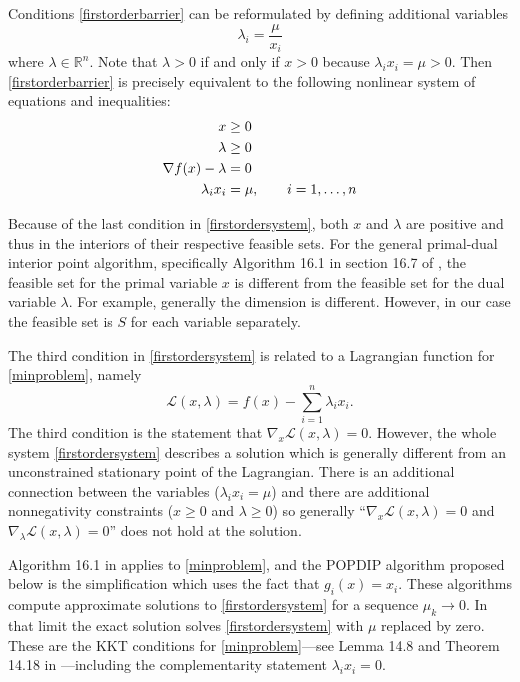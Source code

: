 \documentclass[11pt]{article}
\newcommand{\RR}{\mathbb{R}}
\newcommand{\grad}{\nabla}
\begin{document}
Conditions \eqref{firstorderbarrier} can be reformulated by defining additional variables
    $$\lambda_i = \frac{\mu}{x_i}$$
where $\lambda\in\RR^n$.  Note that $\lambda>0$ if and only if $x>0$ because $\lambda_i x_i = \mu > 0$.  Then \eqref{firstorderbarrier} is precisely equivalent to the following nonlinear system of equations and inequalities:
\begin{align}
x &\ge 0 \label{firstordersystem} \\
\lambda &\ge 0 \notag \\
\grad f(x) - \lambda &= 0 \notag \\
\lambda_i x_i &= \mu, \qquad i=1,\dots,n \notag
\end{align}

Because of the last condition in \eqref{firstordersystem}, both $x$ and $\lambda$ are positive and thus in the interiors of their respective feasible sets.  For the general primal-dual interior point algorithm, specifically Algorithm 16.1 in section 16.7 of \cite{GrivaNashSofer2009}, the feasible set for the primal variable $x$ is different from the feasible set for the dual variable $\lambda$.  For example, generally the dimension is different.  However, in our case the feasible set is $S$ for each variable separately.

The third condition in \eqref{firstordersystem} is related to a Lagrangian function for \eqref{minproblem}, namely
    $$\mathcal{L}(x,\lambda) = f(x) - \sum_{i=1}^n \lambda_i x_i.$$
The third condition is the statement that $\grad_x \mathcal{L}(x,\lambda)=0$.  However, the whole system \eqref{firstordersystem} describes a solution which is generally different from an unconstrained stationary point of the Lagrangian.  There is an additional connection between the variables ($\lambda_i x_i = \mu$) and there are additional nonnegativity constraints ($x\ge 0$ and $\lambda\ge 0$) so generally ``$\grad_x\mathcal{L}(x,\lambda)=0$ and $\grad_\lambda\mathcal{L}(x,\lambda)=0$'' does not hold at the solution.

Algorithm 16.1 in \cite{GrivaNashSofer2009} applies to \eqref{minproblem}, and the POPDIP algorithm proposed below is the simplification which uses the fact that $g_i(x)=x_i$.  These algorithms compute approximate solutions to \eqref{firstordersystem} for a sequence $\mu_k \to 0$.  In that limit the exact solution solves \eqref{firstordersystem} with $\mu$ replaced by zero.  These are the KKT conditions for \eqref{minproblem}---see Lemma 14.8 and Theorem 14.18 in \cite{GrivaNashSofer2009}---including the complementarity statement $\lambda_i x_i=0$.
\end{document}
